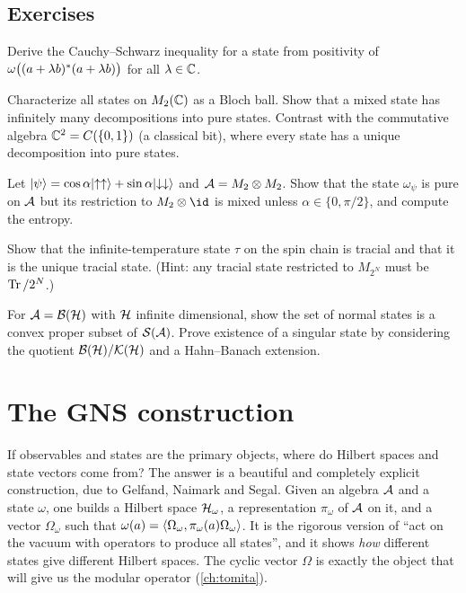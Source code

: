\subsection*{Exercises}
\begin{exercise}\label{ex:states:1}
Derive the Cauchy--Schwarz inequality for a state from positivity of $\omega\big((a+\lambda b)^{*}(a+\lambda b)\big)$ for all $\lambda\in\mathbb{C}$.
\end{exercise}
\begin{exercise}\label{ex:states:2}
Characterize all states on $M_2(\mathbb{C})$ as a Bloch ball. Show that a mixed state has infinitely many decompositions into pure states. Contrast with the commutative algebra $\mathbb{C}^2=C(\{0,1\})$ (a classical bit), where every state has a unique decomposition into pure states.
\end{exercise}
\begin{exercise}\label{ex:states:3}
Let $\lvert \psi\rangle=\cos\alpha\lvert \uparrow\uparrow\rangle+\sin\alpha\lvert \downarrow\downarrow\rangle$ and $\mathcal{A}=M_2\otimes M_2$. Show that the state $\omega_\psi$ is pure on $\mathcal{A}$ but its restriction to $M_2\otimes\id$ is mixed unless $\alpha\in\{0,\pi/2\}$, and compute the entropy.
\end{exercise}
\begin{exercise}\label{ex:states:4}
Show that the infinite-temperature state $\tau$ on the spin chain is tracial and that it is the unique tracial state. (Hint: any tracial state restricted to $M_{2^N}$ must be $\operatorname{Tr}/2^N$.)
\end{exercise}
\begin{exercise}\label{ex:states:5}
For $\mathcal{A}=\mathcal{B}(\mathcal{H})$ with $\mathcal{H}$ infinite dimensional, show the set of normal states is a convex proper subset of $\mathcal S(\mathcal{A})$. Prove existence of a singular state by considering the quotient $\mathcal{B}(\mathcal{H})/\mathcal K(\mathcal{H})$ and a Hahn--Banach extension.
\end{exercise}

\section{The GNS construction}\label{ch:gns}

\mshift{12mm}\begin{physmotiv}
If observables and states are the primary objects, where do Hilbert spaces and state vectors come from? The answer is a beautiful and completely explicit construction, due to Gelfand, Naimark and Segal. Given an algebra $\mathcal{A}$ and a state $\omega$, one builds a Hilbert space $\mathcal{H}_\omega$, a representation $\pi_\omega$ of $\mathcal{A}$ on it, and a vector $\Omega_\omega$ such that $\omega(a)=\langle \Omega_\omega,\pi_\omega(a)\Omega_\omega\rangle$. It is the rigorous version of ``act on the vacuum with operators to produce all states'', and it shows \emph{how} different states give different Hilbert spaces. The cyclic vector $\Omega$ is exactly the object that will give us the modular operator (\cref{ch:tomita}).
\end{physmotiv}

